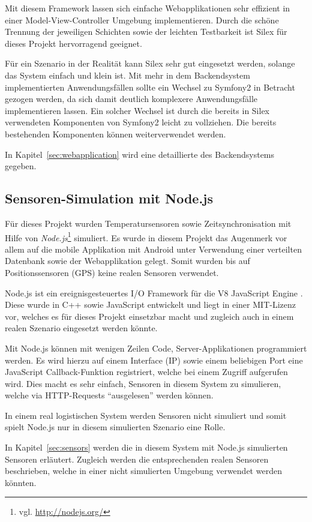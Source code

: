 Mit diesem Framework lassen sich einfache Webapplikationen sehr effizient in einer
	Model-View-Controller Umgebung implementieren. Durch die schöne Trennung der
	jeweiligen Schichten sowie der leichten Testbarkeit ist Silex für dieses
	Projekt hervorragend geeignet.
	
Für ein Szenario in der Realität kann Silex sehr gut eingesetzt werden, solange das
	System einfach und klein ist. Mit mehr in dem Backendsystem implementierten
	Anwendungsfällen sollte ein Wechsel zu Symfony2 in Betracht gezogen werden, da
	sich damit deutlich komplexere Anwendungsfälle implementieren lassen. Ein solcher
	Wechsel ist durch die bereits in Silex verwendeten Komponenten von Symfony2
	leicht zu vollziehen. Die bereits bestehenden Komponenten können
	weiterverwendet werden.
	
In Kapitel~\ref{sec:webapplication} wird eine detaillierte des Backendsystems
	gegeben.

\subsection{Sensoren-Simulation mit Node.js}
\label{subsec:nodejs}

Für dieses Projekt wurden Temperatursensoren sowie Zeitsynchronisation mit
	Hilfe von \emph{Node.js}\footnote{vgl. \url{http://nodejs.org/}} simuliert.
	Es wurde in diesem Projekt das Augenmerk vor allem auf die mobile Applikation
	mit Android unter Verwendung einer verteilten Datenbank sowie der
	Webapplikation gelegt. Somit wurden	bis auf	Positionssensoren (GPS) keine
	realen Sensoren verwendet.

Node.js ist ein ereignisgesteuertes I/O Framework für die V8 JavaScript
	Engine \cite{Wikipedia10a}. Diese wurde in C++ sowie JavaScript entwickelt
	und liegt in einer MIT-Lizenz vor, welches es für dieses Projekt einsetzbar
	macht und zugleich auch in einem realen Szenario eingesetzt werden könnte.

Mit Node.js können mit wenigen Zeilen Code, Server-Applikationen programmiert
	werden. Es wird hierzu auf einem Interface (IP) sowie einem beliebigen Port
	eine JavaScript Callback-Funktion registriert, welche bei einem Zugriff
	aufgerufen wird. Dies macht es sehr einfach, Sensoren in diesem System zu
	simulieren, welche via HTTP-Requests ``ausgelesen'' werden können.
	
In einem real logistischen System werden Sensoren nicht simuliert und somit
	spielt Node.js nur in diesem simulierten Szenario eine Rolle.
	
In Kapitel~\ref{sec:sensors} werden die in diesem System mit Node.js simulierten
	Sensoren erläutert. Zugleich werden die entsprechenden realen Sensoren
	beschrieben, welche in einer nicht simulierten Umgebung verwendet werden
	könnten.
